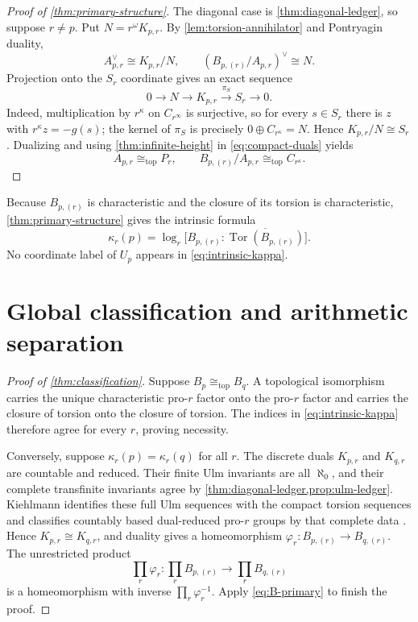 \documentclass[11pt]{article}
\theoremstyle{definition}
\newcommand{\TopIso}{\cong_{\mathrm{top}}}
\DeclareMathOperator{\Tor}{Tor}
\begin{document}
\begin{proof}[Proof of \cref{thm:primary-structure}]
The diagonal case is \cref{thm:diagonal-ledger}, so suppose $r\ne p$.  Put
$N=r^\omega K_{p,r}$.  By \cref{lem:torsion-annihilator} and Pontryagin
duality,
\begin{equation}\label{eq:compact-duals}
A_{p,r}^\vee\cong K_{p,r}/N,
\qquad
(B_{p,(r)}/A_{p,r})^\vee\cong N.
\end{equation}
Projection onto the $S_r$ coordinate gives an exact sequence
\begin{equation}\label{eq:projection-exact}
0\longrightarrow N\longrightarrow K_{p,r}
\xrightarrow{\pi_S}S_r\longrightarrow0.
\end{equation}
Indeed, multiplication by $r^\kappa$ on $C_{r^\infty}$ is surjective, so
for every $s\in S_r$ there is $z$ with $r^\kappa z=-g(s)$; the kernel of
$\pi_S$ is precisely $0\oplus C_{r^\kappa}=N$.  Hence
$K_{p,r}/N\cong S_r$.  Dualizing and using
\cref{thm:infinite-height} in \eqref{eq:compact-duals} yields
\[
A_{p,r}\TopIso P_r,
\qquad
B_{p,(r)}/A_{p,r}\TopIso C_{r^\kappa}.
\]
\end{proof}

Because $B_{p,(r)}$ is characteristic and the closure of its torsion is
characteristic, \cref{thm:primary-structure} gives the intrinsic formula
\begin{equation}\label{eq:intrinsic-kappa}
\kappa_r(p)=
\log_r\bigl[B_{p,(r)}:\overline{\Tor(B_{p,(r)})}\bigr].
\end{equation}
No coordinate label of $U_p$ appears in \eqref{eq:intrinsic-kappa}.

\section{Global classification and arithmetic separation}\label{sec:classification}

\begin{proof}[Proof of \cref{thm:classification}]
Suppose $B_p\TopIso B_q$.  A topological isomorphism carries the unique
characteristic pro-$r$ factor onto the pro-$r$ factor and carries the closure
of torsion onto the closure of torsion.  The indices in
\eqref{eq:intrinsic-kappa} therefore agree for every $r$, proving necessity.

Conversely, suppose $\kappa_r(p)=\kappa_r(q)$ for all $r$.  The discrete
duals $K_{p,r}$ and $K_{q,r}$ are countable and reduced.  Their finite Ulm
invariants are all $\aleph_0$, and their complete transfinite invariants
agree by \cref{thm:diagonal-ledger,prop:ulm-ledger}.  Kiehlmann identifies
these full Ulm sequences with the compact torsion sequences and classifies
countably based dual-reduced pro-$r$ groups by that complete data
\citep[Remark~1.6 and Theorem~1.8]{Kiehlmann2013}.  Hence
$K_{p,r}\cong K_{q,r}$, and duality gives a homeomorphism
$\varphi_r:B_{p,(r)}\to B_{q,(r)}$.  The unrestricted product
\[
\prod_r\varphi_r:
\prod_rB_{p,(r)}\longrightarrow\prod_rB_{q,(r)}
\]
is a homeomorphism with inverse $\prod_r\varphi_r^{-1}$.  Apply
\eqref{eq:B-primary} to finish the proof.
\end{proof}
\end{document}
